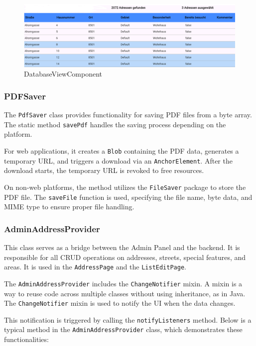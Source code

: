 \begin{figure}[H]
    \centering
    \includegraphics[width=0.9\linewidth]{images/AdminPanel/DataBaseViewComponent.png}
    \caption{DatabaseViewComponent}
\end{figure}


\subsubsection{PDFSaver}
The \texttt{PdfSaver} class provides functionality for saving PDF files from a byte array. The static method \texttt{savePdf} handles the saving process depending on the platform. \blankLine

For web applications, it creates a \texttt{Blob} containing the PDF data, generates a temporary URL, and triggers a download via an \texttt{AnchorElement}. After the download starts, the temporary URL is revoked to free resources.\blankLine

On non-web platforms, the method utilizes the \texttt{FileSaver} package to store the PDF file. The \texttt{saveFile} function is used, specifying the file name, byte data, and MIME type to ensure proper file handling.


\newpage
  \subsubsection{AdminAddressProvider}
  This class serves as a bridge between the Admin Panel and the backend. It is responsible for all CRUD operations on addresses, streets, special features, and areas. It is used in the \texttt{AddressPage} and the \texttt{ListEditPage}. \blankLine

  The \texttt{AdminAddressProvider} includes the \texttt{ChangeNotifier} mixin. A mixin is a way to reuse code across multiple classes without using inheritance, as in Java. \autocite{dart.dev} The \texttt{ChangeNotifier} mixin is used to notify the UI when the data changes. \autocite{flutter.dev}  \blankLine
  
  This notification is triggered by calling the \texttt{notifyListeners} method. Below is a typical method in the \texttt{AdminAddressProvider} class, which demonstrates these functionalities:  
  

